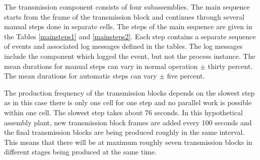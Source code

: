 \documentclass[journal]{IEEEtran}
\begin{document}
The transmission component consists of four subassemblies. The main sequence starts from the frame of the transmission block
and continues through several manual steps done in separate cells. The steps of the main sequence are given in
the Tables \ref{mainsteps1} and \ref{mainsteps2}.
Each step contains a separate sequence of events and associated log messages defined in the tables. The log messages include the component which logged the event, but
not the process instance.
The mean durations for manual steps can vary in normal operation $\pm$ thirty percent. The mean durations for automatic steps can vary
$\pm$ five percent.

The production frequency of the transmission blocks depends on the slowest step as in this case there is only one cell for one step and no
parallel work is possible within one cell. The slowest step takes about 76 seconds. In this hypothetical assembly plant, new transmission block
frames are added every 100 seconds and the final transmission blocks are being produced roughly in the same interval. This means that there
will be at maximum roughly seven transmission blocks in different stages being produced at the same time.
\end{document}
